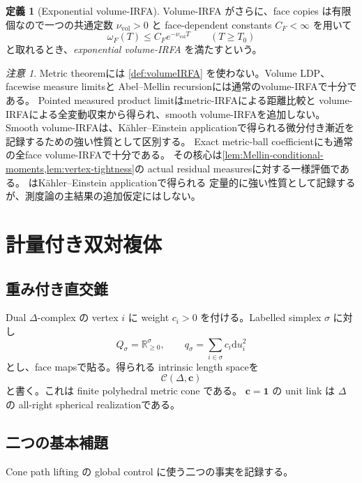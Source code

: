 \documentclass[11pt,a4paper]{ltjsarticle}
\newcommand{\RR}{\mathbb R}
\newcommand{\dd}{\mathrm d}
\newcommand{\cC}{\mathcal C}
\theoremstyle{plain}
\theoremstyle{definition}
\newtheorem{definition}[definition]{定義}
\theoremstyle{remark}
\newtheorem{remark}[remark]{注意}
\begin{document}
\begin{definition}[Exponential volume-IRFA]
\label{def:exp-volumeIRFA}
Volume-IRFA がさらに、face copies は有限個なので一つの共通定数 $\nu_{\mathrm{vol}}>0$ と face-dependent constants $C_F<\infty$ を用いて
\begin{equation}
\label{eq:exp-volumeIRFA}
 \omega_F(T)\le C_F e^{-\nu_{\mathrm{vol}}T}
 \qquad(T\ge T_0)
\end{equation}
と取れるとき、\emph{exponential volume-IRFA} を満たすという。
\end{definition}

\begin{remark}
Metric theoremには \cref{def:volumeIRFA} を使わない。Volume LDP、facewise measure limitsと
Abel--Mellin recursionには通常のvolume-IRFAで十分である。
Pointed measured product limitはmetric-IRFAによる距離比較と
volume-IRFAによる全変動収束から得られ、smooth volume-IRFAを追加しない。
Smooth volume-IRFAは、K\"ahler--Einstein applicationで得られる微分付き漸近を
記録するための強い性質として区別する。
Exact metric-ball coefficientにも通常の全face volume-IRFAで十分である。
その核心は\cref{lem:Mellin-conditional-moments,lem:vertex-tightness}の
actual residual measuresに対する一様評価である。
はK\"ahler--Einstein applicationで得られる
定量的に強い性質として記録するが、測度論の主結果の追加仮定にはしない。
\end{remark}

\section{計量付き双対複体}
\label{sec:cone}

\subsection{重み付き直交錐}
Dual $\Delta$-complex の vertex $i$ に weight $c_i>0$ を付ける。Labelled simplex $\sigma$ に対し
\[
 Q_\sigma=\RR_{\ge0}^{\sigma},\qquad
 q_\sigma=\sum_{i\in\sigma}c_i\dd u_i^2
\]
とし、face mapsで貼る。得られる intrinsic length spaceを
\[
 \cC(\Delta,\bm c)
\]
と書く。これは finite polyhedral metric cone である。
$\bm c=\bm1$ の unit link は $\Delta$ の all-right spherical realizationである。

\subsection{二つの基本補題}
Cone path lifting の global control に使う二つの事実を記録する。
\end{document}

